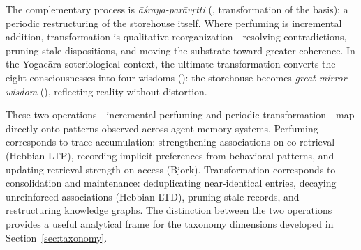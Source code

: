 The complementary process is \emph{\=a\'sraya-par\=av\d{r}tti}
(, transformation of the basis): a periodic restructuring of
the storehouse itself. Where perfuming is incremental addition,
transformation is qualitative reorganization---resolving contradictions,
pruning stale dispositions, and moving the substrate toward greater
coherence. In the Yogac\=ara soteriological context, the ultimate
transformation converts the eight consciousnesses into four wisdoms
(): the storehouse becomes \emph{great mirror wisdom}
(), reflecting reality without distortion.

These two operations---incremental perfuming and periodic
transformation---map directly onto patterns observed across
agent memory systems. Perfuming corresponds to trace accumulation:
strengthening associations on co-retrieval (Hebbian LTP), recording
implicit preferences from behavioral patterns, and updating retrieval
strength on access (Bjork). Transformation corresponds to consolidation
and maintenance: deduplicating near-identical entries, decaying
unreinforced associations (Hebbian LTD), pruning stale records, and
restructuring knowledge graphs. The distinction between the two
operations provides a useful analytical frame for the taxonomy
dimensions developed in Section~\ref{sec:taxonomy}.
